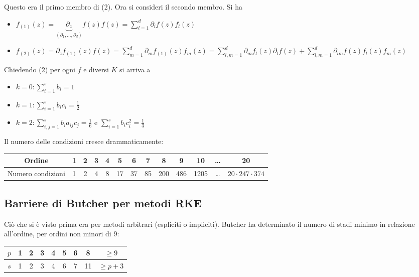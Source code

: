 \documentclass[hidelinks, 10pt]{report}
\begin{document}
Questo era il primo membro di  (2). Ora si consideri il secondo membro. Si ha

\begin{itemize}
\item $ f_{(1)}(z) = \underbrace{\partial_{z}}_{(\partial_{1}, \dotsc, \partial_{d})} f(z) f(z) = \sum\limits_{l = 1}^{d} \partial_{l} f(z) f_{l} (z) $
\item $ f_{(2)}(z) = \partial_{z} f_{(1)}(z) f(z) = \sum\limits_{m = 1}^{d} \partial_{m} f_{(1)} (z) f_{m}(z) = \sum\limits_{l, m = 1}^{d} \partial_{m} f_{l}(z) \partial_{l} f(z) + \sum\limits_{l, m = 1}^{d} \partial_{l m} f(z) f_{l} (z) f_{m} (z) $
\end{itemize}

Chiedendo  (2) per ogni $ f $ e diversi $ K $ si arriva a

\begin{itemize}
\item $ k = 0: \sum\limits_{i = 1}^{s} b_{i} = 1 $
\item $ k = 1: \sum\limits_{i = 1}^{s} b_{i} c_{i} = \frac{1}{2} $
\item $ k = 2: \sum\limits_{i, j = 1}^{s} b_{i} a_{ij} c_{j} = \frac{1}{6} $ e $ \sum\limits_{i = 1}^{s} b_{i} c_{i}^{2} = \frac{1}{3} $
\end{itemize} 

Il numero delle condizioni cresce drammaticamente:

\begin{center}
\begin{tabular}{c|c|c|c|c|c|c|c|c|c|c|c|c}
	Ordine & 1 & 2 & 3 & 4 & 5 & 6 & 7 & 8 & 9 & 10 & \ldots & 20 \\
\hline
	Numero condizioni & 1 & 2 & 4 & 8 & 17 & 37 & 85 & 200 & 486 & 1205 & \ldots & $ 20 \cdot 247 \cdot 374 $ \\
\end{tabular}
\end{center}

\subsection{Barriere di Butcher per metodi RKE}
Ci\`o che si \`e visto prima era per metodi arbitrari (espliciti o impliciti). Butcher ha determinato il numero di stadi minimo in relazione all'ordine, per ordini non minori di 9:

\begin{center}
\begin{tabular}{c|c|c|c|c|c|c|c|c}
	$ p $ & 1 & 2 & 3 & 4 & 5 & 6 & 8 & $ \ge 9 $ \\
\hline
	$ s $ & 1 & 2 & 3 & 4 & 6 & 7 & 11 & $ \ge p + 3 $ \\
\end{tabular}
\end{center}
\end{document}
